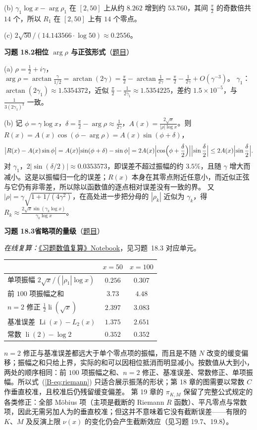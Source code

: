 \documentclass[11pt,a4paper]{article}
\DeclareMathOperator{\Li}{Li}
\DeclareMathOperator{\li}{li}
\newcommand{\bref}[1]{\ref*{B-#1}}
\newcommand{\Sol}[2]{%
  \par\addvspace{1.2em}\noindent
  \hypertarget{s:#1}{}\textbf{习题 #1\quad #2}\hfill{\small（\hyperlink{q:#1}{题目}）}\par
  \nopagebreak\smallskip}
\begin{document}
(b) $\gamma_1\log x-\arg\rho_1$ 在 $[2,50]$ 上从约 $8.262$ 增到约 $53.760$，其间 $\frac\pi2$ 的奇数倍共 $14$ 个，所以 $R_1$ 在 $[2,50]$ 上有 $14$ 个零点。

(c) $2\sqrt{50}/(14.143566\cdot\log50)\approx0.2556$。

\Sol{18.2}{相位 $\arg\rho$ 与正弦形式}
(a) $\rho=\frac12+i\gamma$，$\arg\rho=\arctan\frac{\gamma}{1/2}=\arctan(2\gamma)=\frac\pi2-\arctan\frac1{2\gamma}=\frac\pi2-\frac1{2\gamma}+O(\gamma^{-3})$。
$\gamma_1$：$\arctan(2\gamma_1)\approx1.5354372$，近似 $\frac\pi2-\frac1{2\gamma_1}\approx1.5354225$，差约 $1.5\times10^{-5}$，与 $\frac1{3(2\gamma_1)^3}$ 一致。

(b) 记 $\phi=\gamma\log x$，$\delta=\frac\pi2-\arg\rho\approx\frac1{2\gamma}$，$A(x)=\frac{2\sqrt x}{|\rho|\log x}$。则 $R(x)=A(x)\cos(\phi-\arg\rho)=A(x)\sin(\phi+\delta)$，
\[
  \bigl|R(x)-A(x)\sin\phi\bigr|=A(x)\bigl|\sin(\phi+\delta)-\sin\phi\bigr|=2A(x)\Bigl|\cos\Bigl(\phi+\frac\delta2\Bigr)\Bigr|\Bigl|\sin\frac\delta2\Bigr|\le2A(x)\Bigl|\sin\frac\delta2\Bigr| .
\]
对 $\gamma_1$，$2|\sin(\delta/2)|\approx0.0353573$，即误差不超过振幅的约 $3.5\%$，且随 $\gamma$ 增大而减小。这是以振幅归一化的误差；$R(x)$ 本身在其零点附近任意小，而近似正弦与它仍有非零差，所以除以函数值的逐点相对误差没有一致的界。
又 $|\rho|=\gamma\sqrt{1+1/(4\gamma^2)}$，在高处进一步把分母的 $|\rho_k|$ 近似为 $\gamma_k$，得 $R_k\approx\frac{2\sqrt x\sin(\gamma_k\log x)}{\gamma_k\log x}$。

\Sol{18.3}{省略项的量级}
\emph{在线复算：}\href{https://colab.research.google.com/github/lichengtong123/lichengtong-RH/blob/main/\%E4\%B9\%A0\%E9\%A2\%98\%E4\%B8\%8E\%E8\%A7\%A3\%E7\%AD\%94/\%E4\%B9\%A0\%E9\%A2\%98\%E6\%95\%B0\%E5\%80\%BC\%E5\%A4\%8D\%E7\%AE\%97.ipynb}{《习题数值复算》Notebook}，见习题~18.3 对应单元。

\begin{center}
\small
\begin{tabular}{@{}lcc@{}}
\toprule
 & $x=50$ & $x=100$ \\
\midrule
单项振幅 $2\sqrt x/(|\rho_1|\log x)$ & $0.256$ & $0.307$ \\
前 $100$ 项振幅之和 & $3.73$ & $4.48$ \\
$n=2$ 修正 $\frac12\li(\sqrt x)$ & $2.397$ & $3.083$ \\
基准误差 $\Li(x)-L_2(x)$ & $1.375$ & $2.651$ \\
常数 $\li(2)-\log2$ & $0.352$ & $0.352$ \\
\bottomrule
\end{tabular}
\end{center}
$n=2$ 修正与基准误差都远大于单个零点项的振幅，而且是不随 $N$ 改变的缓变偏移；振幅之和只给上界，实际的和可以因相位抵消而明显减小。按数值从大到小，两处的顺序相同：前 $100$ 项振幅之和、$n=2$ 修正、基准误差、常数修正、单项振幅。所以式~(\bref{eq:riemann}) 只适合展示振荡的形状；第 18 章的图需要以常数 $C$ 作垂直校准，且校准后仍残留缓变偏差。
第 19 章的 $\pi_{K,M}$ 保留了完整公式规定的各类修正：全部 Möbius 项（主项是截断的 Riemann $R$ 函数）、平凡零点与常数项，因此无需另加人为的垂直校准；但这并不意味着它没有截断误差——有限的 $K$、$M$ 及反演上限 $\nu(x)$ 的变化仍会产生截断效应（见习题 19.7、19.8）。
\end{document}
